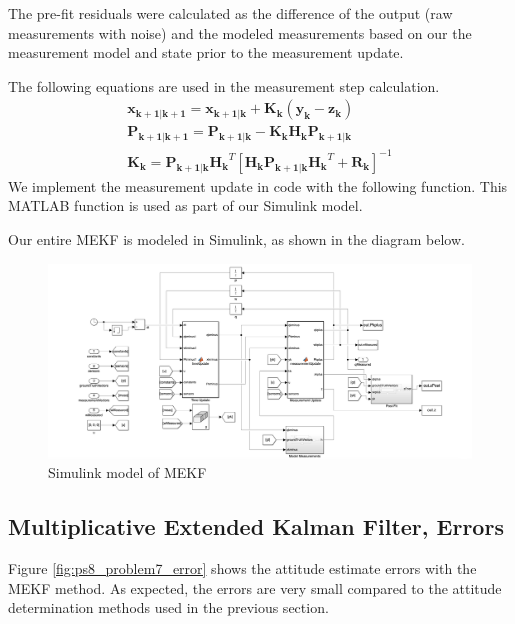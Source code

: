 The pre-fit residuals were calculated as the difference of the output (raw measurements with noise) and the modeled measurements based on our the measurement model and state prior to the measurement update.

The following equations are used in the measurement step calculation.
\begin{align*}
    \mathbf{x_{k+1 | k+1}} = \mathbf{x_{k+1 | k}} + \mathbf{K_k}
    (\mathbf{y_k} - \mathbf{z_k}) \\
    \mathbf{P_{k+1 | k+1}} = \mathbf{P_{k+1 | k}} - 
    \mathbf{K_k} \mathbf{H_k} \mathbf{P_{k+1 | k}} \\
    \mathbf{K_k} = \mathbf{P_{k+1 | k}} \mathbf{H_k}^T [\mathbf{H_k} \mathbf{P_{k+1 | k}} \mathbf{H_k}^T + \mathbf{R_k}]^{-1}
\end{align*}
We implement the measurement update in code with the following function. This MATLAB function is used as part of our Simulink model.



Our entire MEKF is modeled in Simulink, as shown in the diagram below.

\begin{figure}[H]
\centering
\includegraphics[scale=0.27]{Images/ps8_problem5_simulink.png}
\caption{Simulink model of MEKF}
\label{fig:ps8_problem5_simulink}
\end{figure}

\subsection{Multiplicative Extended Kalman Filter, Errors}
Figure \ref{fig:ps8_problem7_error} shows the attitude estimate errors with the MEKF method. As expected, the errors are very small compared to the attitude determination methods used in the previous section.

